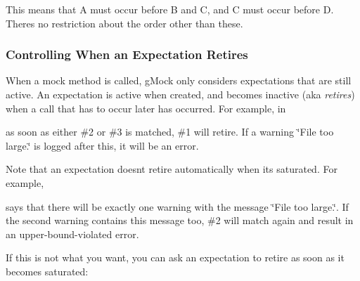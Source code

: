 This means that A must occur before B and C, and C must occur before D. There\textquotesingle{}s no restriction about the order other than these.

\subsubsection*{Controlling When an Expectation Retires}

When a mock method is called, g\+Mock only considers expectations that are still active. An expectation is active when created, and becomes inactive (aka {\itshape retires}) when a call that has to occur later has occurred. For example, in




as soon as either \#2 or \#3 is matched, \#1 will retire. If a warning {\ttfamily \char`\"{}\+File too
large.\char`\"{}} is logged after this, it will be an error.

Note that an expectation doesn\textquotesingle{}t retire automatically when it\textquotesingle{}s saturated. For example,




says that there will be exactly one warning with the message {\ttfamily \char`\"{}\+File too
large.\char`\"{}}. If the second warning contains this message too, \#2 will match again and result in an upper-\/bound-\/violated error.

If this is not what you want, you can ask an expectation to retire as soon as it becomes saturated\+:


